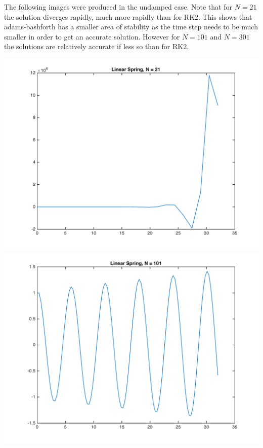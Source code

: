 \documentclass[11pt, oneside]{article}
\begin{document}
\begin{enumerate}
    The following images were produced in the undamped case.
    Note that for $N = 21$ the solution diverges rapidly, much more rapidly
    than for RK2.
    This shows that adams-bashforth has a smaller area of stability as the time
    step needs to be much smaller in order to get an accurate solution.
    However for $N = 101$ and $N = 301$ the solutions are relatively accurate if
    less so than for RK2.
    \begin{center}
      \includegraphics[scale=.4]{Figures/01_15.png}
      \includegraphics[scale=.4]{Figures/01_16.png}

\end{center}
\end{enumerate}
\end{document}
